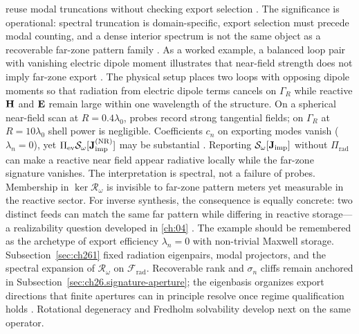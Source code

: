 reuse modal truncations without checking export selection \cite{harrington2001}. The significance
is operational: spectral truncation is domain-specific, export selection must precede modal
counting, and a dense interior spectrum is not the same object as a recoverable far-zone pattern
family \cite{stratton1941}.
As a worked example, a balanced loop pair with vanishing electric dipole moment illustrates
that near-field strength does not imply far-zone export \cite{devaney2004}. The physical setup
places two loops with opposing dipole moments so that radiation from electric dipole terms cancels
on $\Gamma_R$ while reactive $\mathbf{H}$ and $\mathbf{E}$ remain large within one wavelength of the structure.
On a spherical near-field scan at $R=0.4\lambda_0$, probes record strong tangential fields; on
$\Gamma_R$ at $R=10\lambda_0$ shell power is negligible. Coefficients $c_n$ on
exporting modes vanish ($\lambda_n=0$), yet $\Pi_{\mathrm{ev}}\mathcal{S}_\omega[\mathbf{J}_{\mathrm{imp}}^{(\mathrm{NR})}]$
may be substantial \cite{stratton1941}.
Reporting $\mathcal{S}_\omega[\mathbf{J}_{\mathrm{imp}}]$ without $\Pi_{\mathrm{rad}}$ can make a reactive near field
appear radiative locally while the far-zone signature vanishes.
The interpretation is spectral, not a failure of probes. Membership in $\ker\mathcal{R}_\omega$
is invisible to far-zone pattern meters yet measurable in the reactive sector. For inverse
synthesis, the consequence is equally concrete: two distinct feeds can match the same far pattern
while differing in reactive storage---a realizability question developed in \ref{ch:04}
\cite{stratton1941}. The example should be remembered as the archetype of export efficiency
$\lambda_n=0$ with non-trivial Maxwell storage.
\medskip
\noindent
Subsection~\ref{sec:ch261} fixed radiation eigenpairs, modal projectors, and the spectral
expansion of $\mathcal{R}_\omega$ on $\mathcal{F}_{\mathrm{rad}}$. Recoverable rank and
$\sigma_n$ cliffs remain anchored in Subsection~\ref{sec:ch26.signature-aperture}; the eigenbasis
organizes export directions that finite apertures can in principle resolve once regime
qualification holds \cite{stratton1941}. Rotational degeneracy and Fredholm
solvability develop next on the same operator.

